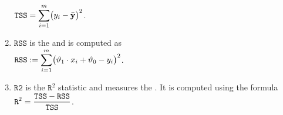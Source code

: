 \begin{enumerate}
      \hspace*{1.3cm}
      $\displaystyle\mathtt{TSS} = \sum\limits_{i=1}^m \bigl(y_i - \bar{\mathbf{y}}\bigr)^2$.
\item $\mathtt{RSS}$ is the  and is computed as
      \\[0.2cm]
      \hspace*{1.3cm}
      $\displaystyle\mathtt{RSS} := \sum\limits_{i=1}^m \bigl(\vartheta_1 \cdot x_i + \vartheta_0 - y_i\bigr)^2$.
\item $\mathtt{R2}$ is the $\mathtt{R}^2$ statistic and measures the .
      It is computed using the formula
      \\[0.2cm]
      \hspace*{1.3cm}
      $\displaystyle \mathtt{R}^2 = \frac{\mathtt{TSS} - \mathtt{RSS}}{\mathtt{TSS}}$.
\end{enumerate}


